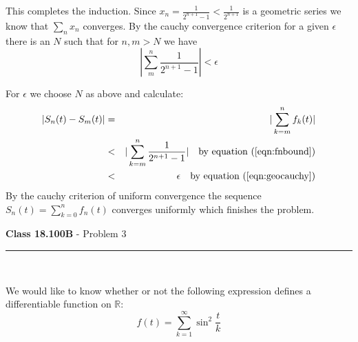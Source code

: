 \documentclass[11pt,reqno]{article}
\begin{document}
This completes the induction.
Since $x_n = \frac{1}{2^{n+1}-1} < \frac{1}{2^{n+1}}$ is a geometric series we know that $\sum_n x_n$ converges. By the cauchy convergence criterion for a given $\epsilon$ there is an $N$ such that for $n,m > N$ we have 
\begin{equation}
|\sum_m^n  \frac{1}{2^{n+1}-1} | < \epsilon \label{eqn:geocauchy}
\end{equation}

\noindent For $\epsilon$ we choose $N$ as above and calculate:
\begin{eqnarray*}
|S_n(t)-S_m(t)| &=& |\sum_{k=m}^n f_k(t)| \\
		         &<& |\sum_{k=m}^n \frac{1}{2^{n+1}-1}| \quad \text{by equation ($\ref{eqn:fnbound}$)} \\
		         &<& \epsilon  \quad \text{by equation ($\ref{eqn:geocauchy}$)} \\
\end{eqnarray*}
By the cauchy criterion of uniform convergence the sequence $S_n(t) = \sum_{k=0}^n f_n(t)$ converges uniformly which finishes the problem.

\vspace{15pt}
\begin{flushleft} 
\textbf{Class 18.100B} - Problem 3\\
\rule{500pt}{1pt}\\
\end{flushleft} 
 
 We would like to know whether or not the following expression defines a differentiable function on $\mathbb{R}$:
 \begin{equation}
 f(t) = \sum_{k=1}^\infty \sin^2 \frac{t}{k} \nonumber
 \end{equation}
 
\end{document}
